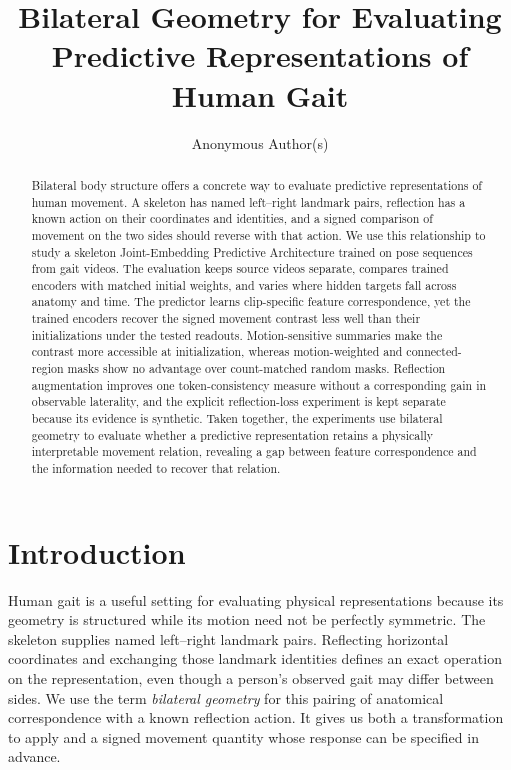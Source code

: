 \documentclass{article}
\title{Bilateral Geometry for Evaluating Predictive Representations of Human Gait}
\author{Anonymous Author(s)}
\begin{document}
\maketitle
\begin{abstract}
Bilateral body structure offers a concrete way to evaluate predictive representations of human movement. A skeleton has named left--right landmark pairs, reflection has a known action on their coordinates and identities, and a signed comparison of movement on the two sides should reverse with that action. We use this relationship to study a skeleton Joint-Embedding Predictive Architecture trained on pose sequences from gait videos. The evaluation keeps source videos separate, compares trained encoders with matched initial weights, and varies where hidden targets fall across anatomy and time. The predictor learns clip-specific feature correspondence, yet the trained encoders recover the signed movement contrast less well than their initializations under the tested readouts. Motion-sensitive summaries make the contrast more accessible at initialization, whereas motion-weighted and connected-region masks show no advantage over count-matched random masks. Reflection augmentation improves one token-consistency measure without a corresponding gain in observable laterality, and the explicit reflection-loss experiment is kept separate because its evidence is synthetic. Taken together, the experiments use bilateral geometry to evaluate whether a predictive representation retains a physically interpretable movement relation, revealing a gap between feature correspondence and the information needed to recover that relation.
\end{abstract}
\section{Introduction}\label{introduction}

Human gait is a useful setting for evaluating physical representations because its geometry is structured while its motion need not be perfectly symmetric. The skeleton supplies named left--right landmark pairs. Reflecting horizontal coordinates and exchanging those landmark identities defines an exact operation on the representation, even though a person's observed gait may differ between sides. We use the term \emph{bilateral geometry} for this pairing of anatomical correspondence with a known reflection action. It gives us both a transformation to apply and a signed movement quantity whose response can be specified in advance.
\end{document}
